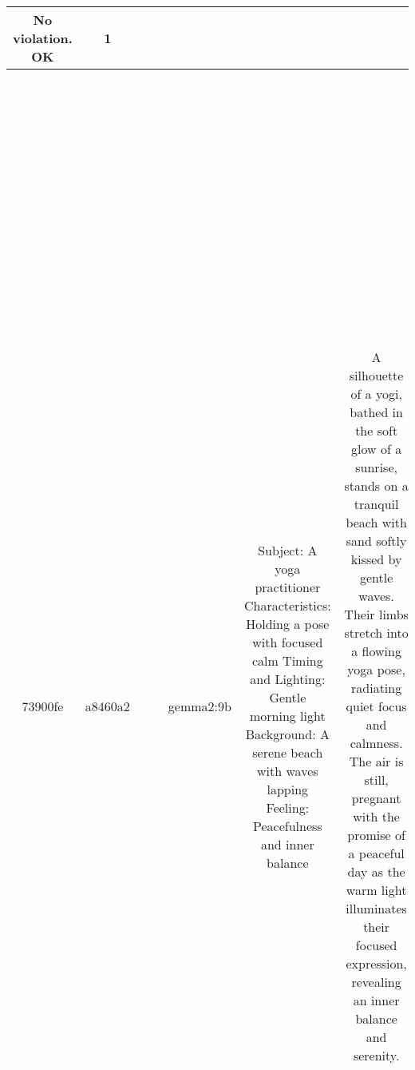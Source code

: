 \begin{table}[h!]
\begin{tabular}{|c|c|c|c|c|c|c|c|c|c|}
No violation.
OK & 1\\
\hline
73900fe & a8460a2 &  &  & gemma2:9b & Subject: A yoga practitioner  
Characteristics: Holding a pose with focused calm  
Timing and Lighting: Gentle morning light  
Background: A serene beach with waves lapping  
Feeling: Peacefulness and inner balance & A silhouette of a yogi, bathed in the soft glow of a sunrise, stands on a tranquil beach with sand softly kissed by gentle waves. Their limbs stretch into a flowing yoga pose, radiating quiet focus and calmness. The air is still, pregnant with the promise of a peaceful day as the warm light illuminates their focused expression, revealing an inner balance and serenity. 


 & ok & The chatbot output complies with the description in several aspects. It maintains the word limit, staying well under 80 words. The description focuses on the subject—a silhouette of a yogi—describing their characteristics such as their yoga pose and the calmness they radiate. It then provides details on timing and lighting by mentioning the "soft glow of a sunrise" and the "warm light." The background is depicted as a "tranquil beach with sand softly kissed by gentle waves." Finally, the output effectively conveys a mood of "quiet focus and calmness," achieving a feeling of "inner balance and serenity." The description is written in a single paragraph in English, combining artistic insight with precise imagery.

No violation.
OK & 1\\
\hline
73900fe & a8460a2 &  &  & qwen2.5:3b & Subject: A yoga practitioner  
Characteristics: Holding a pose with focused calm  
Timing and Lighting: Gentle morning light  
Background: A serene beach with waves lapping  
Feeling: Peacefulness and inner balance & A yoga practitioner holds a serene pose under gentle morning light on a tranquil beach where waves softly lap against the shore, evoking feelings of profound peace and inner balance. & ok & The output provided by the chatbot is a detailed prompt crafted in a single paragraph and limited to 80 words. It focuses on the subject, a yoga practitioner, and their characteristic, holding a serene pose. It describes the timing and lighting with "gentle morning light" and specifies the background as a "tranquil beach where waves softly lap against the shore." Lastly, it conveys the emotional feeling of the image, which is "profound peace and inner balance." All elements as per the description are present, adhering to the specified format.


\end{tabular}
\end{table}
